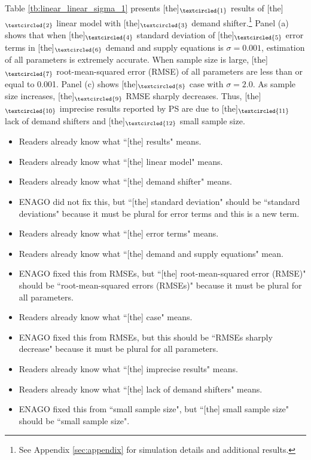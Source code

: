\documentclass[11pt, a4paper]{article}
\begin{document}
Table \ref{tb:linear_linear_sigma_1} presents [the]$_{\textcircled{1}}$ results of [the]$_{\textcircled{2}}$ linear model with [the]$_{\textcircled{3}}$ demand shifter.\footnote{See Appendix \ref{sec:appendix} for simulation details and additional results.}
Panel (a) shows that when [the]$_{\textcircled{4}}$ standard deviation of [the]$_{\textcircled{5}}$ error terms in [the]$_{\textcircled{6}}$ demand and supply equations is $\sigma = 0.001$, estimation of all parameters is extremely accurate.
When sample size is large, [the]$_{\textcircled{7}}$ root-mean-squared error (RMSE) of all parameters are less than or equal to 0.001. 
Panel (c) shows [the]$_{\textcircled{8}}$ case with $\sigma = 2.0$. 
As sample size increases, [the]$_{\textcircled{9}}$ RMSE sharply decreases. 
Thus, [the]$_{\textcircled{10}}$ imprecise results reported by PS are due to [the]$_{\textcircled{11}}$ lack of demand shifters and [the]$_{\textcircled{12}}$ small sample size.

\begin{itemize}
    \item[\textcircled{1}] Readers already know what ``[the] results"  means.
    \item[\textcircled{2}] Readers already know what ``[the] linear model"  means.
    \item[\textcircled{3}] Readers already know what ``[the] demand shifter"  means.
    \item[\textcircled{4}] ENAGO did not fix this, but ``[the] standard deviation" should be ``standard deviations"  because it must be plural for error terms and this is a new term.
    \item[\textcircled{5}] Readers already know what ``[the] error terms"  means.
    \item[\textcircled{6}] Readers already know what ``[the] demand and supply equations"  mean.
    \item[\textcircled{7}] ENAGO fixed this from RMSEs, but ``[the] root-mean-squared error (RMSE)" should be ``root-mean-squared errors (RMSEs)" because it must be plural for all parameters.
    \item[\textcircled{8}] Readers already know what ``[the] case"  means.
    \item[\textcircled{9}] ENAGO fixed this from RMSEs, but this should be ``RMSEs sharply decrease" because it must be plural for all parameters.
    \item[\textcircled{10}] Readers already know what ``[the] imprecise results" means.
    \item[\textcircled{11}] Readers already know what ``[the] lack of demand shifters" means.
    \item[\textcircled{12}] ENAGO fixed this from ``small sample size", but ``[the] small sample size" should be ``small sample size".
\end{itemize}
\end{document}
